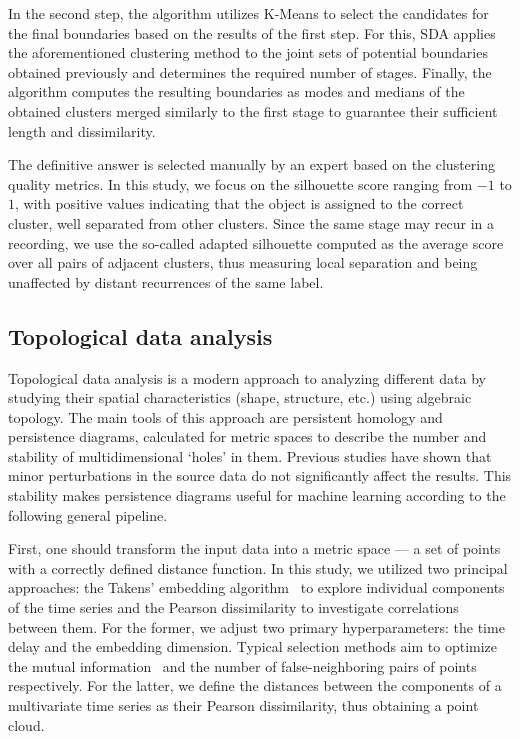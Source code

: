 \documentclass[pdflatex,sn-basic,Numbered]{sn-jnl}
\begin{document}
In the second step, the algorithm utilizes K-Means to select the candidates for the final boundaries based on the results of the first step. For this, SDA applies the aforementioned clustering method to the joint sets of potential boundaries obtained previously and determines the required number of stages. Finally, the algorithm computes the resulting boundaries as modes and medians of the obtained clusters merged similarly to the first stage to guarantee their sufficient length and dissimilarity.

The definitive answer is selected manually by an expert based on the clustering quality metrics. In this study, we focus on the silhouette score ranging from $-1$ to $1$, with positive values indicating that the object is assigned to the correct cluster, well separated from other clusters. Since the same stage may recur in a recording, we use the so-called adapted silhouette computed as the average score over all pairs of adjacent clusters, thus measuring local separation and being unaffected by distant recurrences of the same label.

\subsection{Topological data analysis}

Topological data analysis is a modern approach to analyzing different data by studying their spatial characteristics (shape, structure, etc.) using algebraic topology. The main tools of this approach are persistent homology and persistence diagrams, calculated for metric spaces to describe the number and stability of multidimensional `holes' in them. Previous studies have shown that minor perturbations in the source data do not significantly affect the results. This stability makes persistence diagrams useful for machine learning according to the following general pipeline.

First, one should transform the input data into a metric space --- a set of points with a correctly defined distance function. In this study, we utilized two principal approaches: the Takens' embedding algorithm~\cite{10.1007/BFb0091924,perea2013slidingwindowspersistenceapplication} to explore individual components of the time series and the Pearson dissimilarity to investigate correlations between them. For the former, we adjust two primary hyperparameters: the time delay and the embedding dimension. Typical selection methods aim to optimize the mutual information~\cite{PhysRevA.33.1134} and the number of false-neighboring pairs of points~\cite{PhysRevA.45.3403} respectively. For the latter, we define the distances between the components of a multivariate time series as their Pearson dissimilarity, thus obtaining a point cloud.
\end{document}
